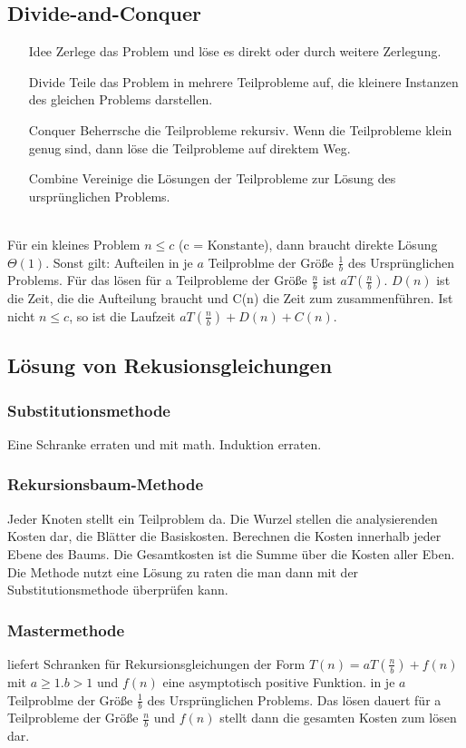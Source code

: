 \documentclass[jou,apacite]{apa6}
\begin{document}
\subsection{Divide-and-Conquer}
\begin{itemize}
    \item[Idee] Zerlege das Problem und löse es direkt oder durch weitere Zerlegung.
    \item[Divide] Teile das Problem in mehrere Teilprobleme auf, die kleinere Instanzen des gleichen Problems darstellen.
    \item[Conquer] Beherrsche die Teilprobleme rekursiv. Wenn die Teilprobleme klein genug sind, dann löse die Teilprobleme auf direktem Weg.
    \item[Combine] Vereinige die Lösungen der Teilprobleme zur Lösung des ursprünglichen Problems.
\end{itemize}\\
Für ein kleines Problem $n\le c$ (c = Konstante), dann braucht direkte Lösung $\Theta(1)$. Sonst gilt: Aufteilen in je $a$ Teilproblme der Größe $\frac{1}{b}$ des Ursprünglichen Problems. Für das lösen für a Teilprobleme der Größe $\frac{n}{b}$ ist $aT(\frac{n}{b})$. $D(n)$ ist die Zeit, die die Aufteilung braucht und C(n) die Zeit zum zusammenführen. Ist nicht $n\le c$, so ist die Laufzeit $aT(\frac{n}{b}) + D(n) + C(n)$.

\subsection{Lösung von Rekusionsgleichungen}

\subsubsection{Substitutionsmethode}
Eine Schranke erraten und mit math. Induktion erraten.

\subsubsection{Rekursionsbaum-Methode} 
Jeder Knoten stellt ein Teilproblem da. Die Wurzel stellen die analysierenden Kosten dar, die Blätter die Basiskosten. Berechnen die Kosten innerhalb jeder Ebene des Baums. Die Gesamtkosten ist die Summe über die Kosten aller Eben. Die Methode nutzt eine Lösung zu raten die man dann mit der Substitutionsmethode überprüfen kann.

\subsubsection{Mastermethode} 
liefert Schranken für Rekursionsgleichungen der Form $T(n) = aT(\frac{n}{b})+f(n)$ mit $a\ge 1. b>1$ und $f(n)$ eine asymptotisch positive Funktion. in  je $a$ Teilproblme der Größe $\frac{1}{b}$ des Ursprünglichen Problems. Das lösen dauert für a Teilprobleme der Größe $\frac{n}{b}$ und $f(n)$ stellt dann die gesamten Kosten zum lösen dar.
\end{document}
